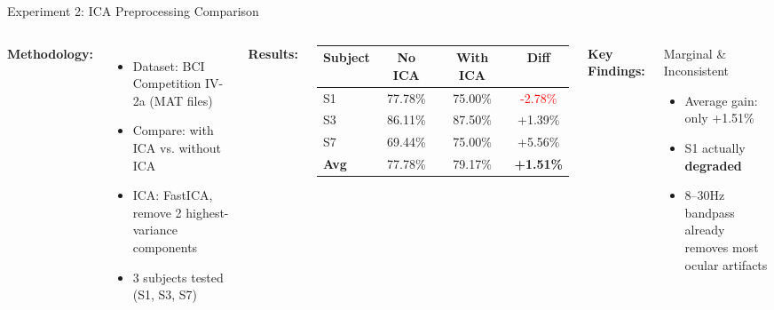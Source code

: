 \documentclass[aspectratio=169, 11pt]{beamer}
\begin{document}
\begin{frame}{Experiment 2: ICA Preprocessing Comparison}
    \begin{columns}[T]
        \textbf{Methodology:}
        \begin{itemize}
            \item Dataset: BCI Competition IV-2a (MAT files)
            \item Compare: with ICA vs. without ICA
            \item ICA: FastICA, remove 2 highest-variance components
            \item 3 subjects tested (S1, S3, S7)
        \end{itemize}
        
        \vspace{3mm}
        \textbf{Results:}
        \begin{table}
            \centering
            \small
            \begin{tabular}{lccc}
                \toprule
                Subject & No ICA & With ICA & Diff \\
                \midrule
                S1 & 77.78\% & 75.00\% & \textcolor{red}{-2.78\%} \\
                S3 & 86.11\% & 87.50\% & \textcolor{completed}{+1.39\%} \\
                S7 & 69.44\% & 75.00\% & \textcolor{completed}{+5.56\%} \\
                \midrule
                \textbf{Avg} & 77.78\% & 79.17\% & \textbf{+1.51\%} \\
                \bottomrule
            \end{tabular}
        \end{table}
        
        \textbf{Key Findings:}
        
        \vspace{3mm}
        \begin{alertblock}{Marginal \& Inconsistent}
            \begin{itemize}
                \item Average gain: only +1.51\%
                \item S1 actually \textbf{degraded}
                \item 8--30Hz bandpass already removes most ocular artifacts
            \end{itemize}
        \end{alertblock}
        

\end{columns}
\end{frame}
\end{document}
